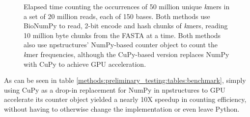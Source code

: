 \begin{figure}[H]
\centering
{}
\caption{
  Elapsed time counting the occurrences of 50 million unique \textit{k}mers in a set of 20 million reads, each of 150 bases.
  Both methods use BioNumPy to read, 2-bit encode and hash chunks of \textit{k}mers, reading 10 million byte chunks from the FASTA at a time.
  Both methods also use npstructures' NumPy-based counter object to count the \textit{k}mer frequencies, although the CuPy-based version replaces NumPy with CuPy to achieve GPU acceleration.
}
\label{methods:preliminary_testing:figures:benchmark}
\end{figure}

As can be seen in table \ref{methods:preliminary_testing:tables:benchmark}, simply using CuPy as a drop-in replacement for NumPy in npstructures to GPU accelerate its counter object yielded a nearly 10X speedup in counting efficiency, without having to otherwise change the implementation or even leave Python.
